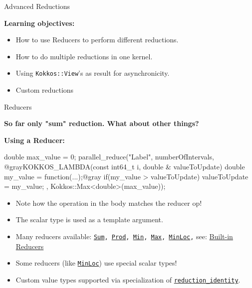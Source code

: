 
\begin{frame}[fragile]{}

  {\Huge Advanced Reductions}

  \vspace{20pt}

  \textbf{Learning objectives:}
  \begin{itemize}
    \item{How to use Reducers to perform different reductions.}
    \item{How to do multiple reductions in one kernel.}
    \item{Using \texttt{Kokkos::View}'s as result for asynchronicity.}
    \item{Custom reductions}
  \end{itemize}

  \vspace{-20pt}

\end{frame}

\begin{frame}[fragile]{Reducers}

\textbf{So far only "sum" reduction. What about other things?}

\textbf{Using a Reducer:}
\begin{code}[linebackgroundcolor={
          \btLstHL<2->{5}{red!20}
        }, keywords={parallel_reduce,double,Max}]
double max_value = 0;
parallel_reduce("Label", numberOfIntervals,
  @grayKOKKOS_LAMBDA(const int64_t i, double & valueToUpdate) {
    double my_value = function(...);@gray
    if(my_value > valueToUpdate) valueToUpdate = my_value;
}, Kokkos::Max<double>(max_value));
\end{code}

\begin{itemize}
\item<2-> Note how the operation in the body matches the reducer op!
\item<3-> The scalar type is used as a template argument.
\item<4-> Many reducers available: \texttt{\href{https://kokkos.org/kokkos-core-wiki/API/core/builtinreducers/Sum.html}{Sum}, \href{https://kokkos.org/kokkos-core-wiki/API/core/builtinreducers/Prod.html}{Prod}, \href{https://kokkos.org/kokkos-core-wiki/API/core/builtinreducers/Min.html}{Min}, \href{https://kokkos.org/kokkos-core-wiki/API/core/builtinreducers/Max.html}{Max}, \href{https://kokkos.org/kokkos-core-wiki/API/core/builtinreducers/MinLoc.html}{MinLoc},} see: \href{https://kokkos.github.io/kokkos-core-wiki/API/core/builtin_reducers.html}{Built-in Reducers}
\item<5-> Some reducers (like \texttt{\href{https://kokkos.org/kokkos-core-wiki/API/core/builtinreducers/MinLoc.html}{MinLoc}}) use special scalar types!
\item<6-> Custom value types supported via specialization of \texttt{\href{https://kokkos.org/kokkos-core-wiki/API/core/builtinreducers/reduction_identity.html}{reduction\_identity}}.
\end{itemize}
\end{frame}

